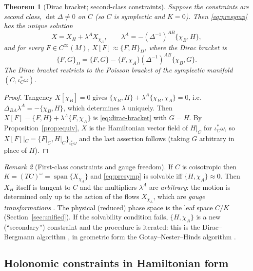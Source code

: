\documentclass[11pt,a4paper]{article}
\numberwithin{equation}{section}
\theoremstyle{plain}
\newtheorem{theorem}{Theorem}[section]
\theoremstyle{definition}
\theoremstyle{remark}
\newtheorem{remark}[theorem]{Remark}
\newcommand{\pb}[2]{\{#1,#2\}}
\newcommand{\weq}{\mathrel{\approx}}
\begin{document}
\begin{theorem}[Dirac bracket; second-class constraints]\label{thm:dirac}
Suppose the constraints are second class, $\det\Delta\neq0$ on $C$ (so $C$ is symplectic and $K=0$). Then \eqref{eq:presymp} has the unique solution
\begin{equation}\label{eq:dirac-sol}
X=X_H+\lambda^AX_{\chi_A},\qquad \lambda^A=-(\Delta^{-1})^{AB}\pb{\chi_B}{H},
\end{equation}
and for every $F\in C^\infty(M)$, $X[F]\weq\pb FH_D$, where the \emph{Dirac bracket} is
\begin{equation}\label{eq:dirac-bracket}
\pb FG_D=\pb FG-\pb F{\chi_A}(\Delta^{-1})^{AB}\pb{\chi_B}G .
\end{equation}
The Dirac bracket restricts to the Poisson bracket of the symplectic manifold $(C,\iota_C^*\omega)$.
\end{theorem}
\begin{proof}
Tangency $X[\chi_B]=0$ gives $\pb{\chi_B}H+\lambda^A\pb{\chi_B}{\chi_A}=0$, i.e.\ $\Delta_{BA}\lambda^A=-\pb{\chi_B}H$, which determines $\lambda$ uniquely. Then $X[F]=\pb FH+\lambda^A\pb F{\chi_A}$ is \eqref{eq:dirac-bracket} with $G=H$. By Proposition~\ref{prop:equiv}, $X$ is the Hamiltonian vector field of $H|_C$ for $\iota_C^*\omega$, so $X[F]|_C=\{F|_C,H|_C\}_{\iota_C^*\omega}$ and the last assertion follows (taking $G$ arbitrary in place of $H$).
\end{proof}

\begin{remark}[First-class constraints and gauge freedom]\label{rem:firstclass}
If $C$ is coisotropic then $K=(TC)^\omega=\operatorname{span}\{X_{\chi_A}\}$ and \eqref{eq:presymp} is solvable iff $\pb H{\chi_A}\weq0$. Then $X_H$ itself is tangent to $C$ and the multipliers $\lambda^A$ are \emph{arbitrary}: the motion is determined only up to the action of the flows $X_{\chi_A}$, which are \emph{gauge transformations} \cite{dirac1964,henneaux1992}. The physical (reduced) phase space is the leaf space $C/K$ (Section~\ref{sec:unified}). If the solvability condition fails, $\pb{H}{\chi_A}$ is a new (``secondary'') constraint and the procedure is iterated: this is the Dirac--Bergmann algorithm \cite{bergmann1949,andersonbergmann1951,dirac1950}, in geometric form the Gotay--Nester--Hinds algorithm \cite{gnh1978,gotaynester1979}.
\end{remark}

\subsection{Holonomic constraints in Hamiltonian form}\label{sec:holoham}
\end{document}
